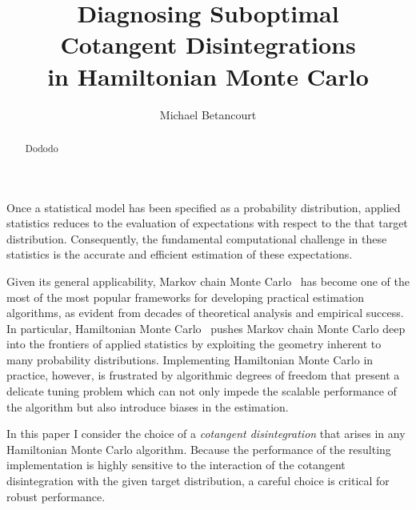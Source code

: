 \documentclass[stslayout]{imsart}
\begin{document}
\begin{frontmatter}

\title{Diagnosing Suboptimal \\
        Cotangent Disintegrations \\
        in Hamiltonian Monte Carlo}

\begin{aug}
  \author{Michael Betancourt%
  }


  \address{Department of Statistics, University of Warwick, 
  Coventry CV4 7AL, UK \\ .}

\end{aug}

\begin{abstract}
Dododo
\end{abstract}

\begin{keyword}
\end{keyword}
\end{frontmatter}

Once a statistical model has been specified as a probability distribution, 
applied statistics reduces to the evaluation of expectations with respect to the 
that target distribution.  Consequently, the fundamental computational challenge 
in these statistics is the accurate and efficient estimation of these expectations.  

Given its general applicability, Markov chain Monte Carlo~\citep{RobertEtAl:1999,
BrooksEtAl:2011} has become one of the most of the most popular frameworks 
for developing practical estimation algorithms, as evident from decades of 
theoretical analysis and empirical success.  In particular, Hamiltonian Monte 
Carlo~\citep{DuaneEtAl:1987, Neal:2011, BetancourtEtAl:2014a} pushes Markov 
chain Monte Carlo deep into the frontiers of applied statistics by exploiting the
geometry inherent to many probability distributions.  Implementing Hamiltonian 
Monte Carlo in practice, however, is frustrated by algorithmic degrees of freedom
that present a delicate tuning problem which can not only impede the scalable
performance of the algorithm but also introduce biases in the estimation.  

In this paper I consider the choice of a \emph{cotangent disintegration} that 
arises in any Hamiltonian Monte Carlo algorithm.  Because the performance of 
the resulting implementation is highly sensitive to the interaction of the cotangent
disintegration with the given target distribution, a careful choice is critical for 
robust performance.
\end{document}
